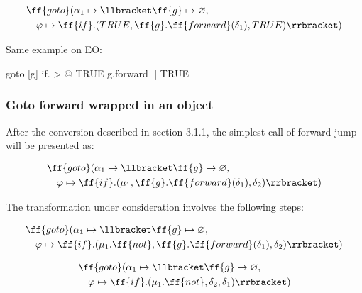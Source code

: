 \documentclass[sigplan,review,11pt,nonacm,natbib=false]{acmart}
\begin{document}
\begin{equation}
\begin{split}
& \ff{goto}(\alpha_1 \mapsto \llbracket \ff{g} \mapsto \varnothing, \\
& \quad \varphi \mapsto \ff{if}.( TRUE, \ff{g}.\ff{forward}(\delta_1), TRUE ) \rrbracket) 
\end{split}
\end{equation}

Same example on EO:

\begin{ffcode}
goto
  [g]
    if. > @
      TRUE
      g.forward ||
      TRUE
\end{ffcode}


\subsubsection{Goto forward wrapped in an object}

After the conversion described in section 3.1.1, the simplest call of forward jump will be presented as:

\begin{equation}
\begin{split}
& \ff{goto} ( \alpha_1 \mapsto \llbracket \ff{g} \mapsto \varnothing, \\
& \quad \varphi \mapsto \ff{if}.(\mu_1, \ff{g}.\ff{forward}(\delta_1), \delta_2) \rrbracket) \\
\end{split}
\end{equation}

The transformation under consideration involves the following steps:

\begin{equation}
\begin{split}
& \ff{goto} ( \alpha_1 \mapsto \llbracket \ff{g} \mapsto \varnothing, \\
& \quad \varphi \mapsto \ff{if}.(\mu_1.\ff{not}, \ff{g}.\ff{forward}(\delta_1), \delta_2) \rrbracket) \\
\end{split}
\end{equation}

\begin{equation}
\begin{split}
& \ff{goto} ( \alpha_1 \mapsto \llbracket \ff{g} \mapsto \varnothing, \\
& \quad \varphi \mapsto \ff{if}.(\mu_1.\ff{not}, \delta_2, \delta_1) \rrbracket) \\
\end{split}
\end{equation}
\end{document}
